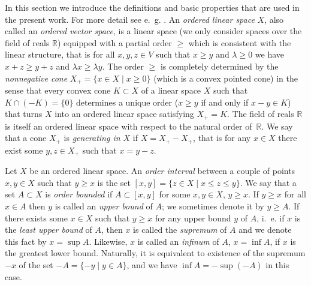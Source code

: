 \documentclass [a4paper, 12pt] {amsart}
\begin{document}
In this section we introduce the definitions and basic properties that are used in the present work.
For more detail see e.~g. \cite {conesandduality}.
An \emph {ordered linear space} $X$, also called an \emph {ordered vector space}, is a linear space
(we only consider spaces over the field of reals $\mathbb R$) equipped with a partial order
$\geqslant$ which is consistent with the linear structure, that is for all $x, y, z \in V$ such that $x \geqslant y$
and $\lambda \geqslant 0$ we have $x + z \geqslant y + z$ and $\lambda x \geqslant \lambda y$.
The order $\geqslant$ is completely determined by the \emph {nonnegative cone} $X_+ = \{x \in X \mid x \geqslant 0\}$
(which is a convex pointed cone) in the sense that every convex cone $K \subset X$ of a linear space $X$ such that $K \cap (-K) = \{0\}$
determines a unique order ($x \geqslant y$ if and only if $x - y \in K$) that turns $X$ into an ordered linear space satisfying $X_+ = K$.
The field of reals $\mathbb R$ is itself an ordered linear space with respect to the natural order
of~$\mathbb R$.  We say that a cone $X_+$ is \emph {generating in $X$} if $X = X_+ - X_+$, that is for any $x \in X$ there exist some
$y, z \in X_+$ such that $x = y - z$.

Let $X$ be an ordered linear space.
An \emph {order interval} between a couple of points $x, y \in X$ such that $y \geqslant x$ is the set
$[x, y] = \{ z \in X \mid x \leqslant z \leqslant y \}$.  We say that a set $A \subset X$ is \emph {order bounded} if
$A \subset [x, y]$ for some $x, y \in X$, $y \geqslant x$.  If $y \geqslant x$ for all $x \in A$ then $y$ is called an \emph {upper bound} of $A$;
we sometimes denote it by $y \geqslant A$.
If there exists some $x \in X$ such that $y \geqslant x$ for any upper bound $y$ of $A$, i.~e. if $x$ is the \emph {least upper bound} of $A$,
then $x$ is called the \emph {supremum} of $A$ and we denote this
fact by $x = \sup A$.  Likewise, $x$ is called an \emph {infinum} of $A$, $x = \inf A$, if $x$ is the greatest lower bound.
Naturally, it is equivalent to existence of the supremum $-x$ of the set $-A = \{-y \mid y \in A\}$, and we have $\inf A = -\sup (-A)$
in this case.
\end{document}
